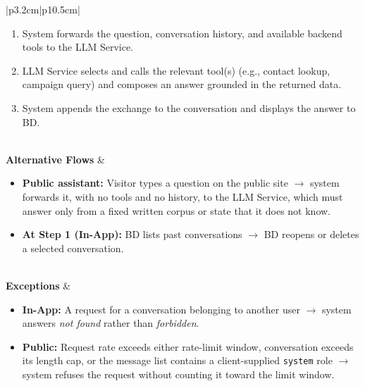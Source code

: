 \documentclass[a4paper]{article}
\begin{document}
\begin{table}[H]
\begin{tabular}{|p{3.2cm}|p{10.5cm}|}
\begin{minipage}[t]{\linewidth}
\begin{enumerate}[nosep,leftmargin=*]
  \item System forwards the question, conversation history, and
  available backend tools to the LLM Service.
  \item LLM Service selects and calls the relevant tool(s) (e.g.,
  contact lookup, campaign query) and composes an answer grounded in
  the returned data.
  \item System appends the exchange to the conversation and displays
  the answer to BD.
\end{enumerate}
\end{minipage} \\
\hline
\textbf{Alternative Flows} &
\begin{minipage}[t]{\linewidth}
\begin{itemize}[nosep,leftmargin=*]
  \item \textbf{Public assistant:} Visitor types a question on the
  public site $\rightarrow$ system forwards it, with no tools and no
  history, to the LLM Service, which must answer only from a fixed
  written corpus or state that it does not know.
  \item \textbf{At Step 1 (In-App):} BD lists past conversations
  $\rightarrow$ BD reopens or deletes a selected conversation.
\end{itemize}
\end{minipage} \\
\hline
\textbf{Exceptions} &
\begin{minipage}[t]{\linewidth}
\begin{itemize}[nosep,leftmargin=*]
  \item \textbf{In-App:} A request for a conversation belonging to
  another user $\rightarrow$ system answers \emph{not found} rather
  than \emph{forbidden}.
  \item \textbf{Public:} Request rate exceeds either rate-limit
  window, conversation exceeds its length cap, or the message list
  contains a client-supplied \texttt{system} role $\rightarrow$
  system refuses the request without counting it toward the limit
  window.
\end{itemize}
\end{minipage} \\
\hline
\end{tabular}
\end{table}
\end{document}
